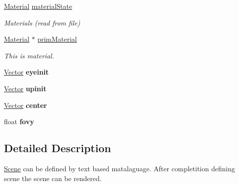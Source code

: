 \textbf{ }\par
\begin{DoxyCompactItemize}
\item 
\mbox{\hyperlink{class_material}{Material}} \mbox{\hyperlink{class_scene_a0a38f5f1255de8f6f5826e7dacb8cbd7}{material\+State}}
\begin{DoxyCompactList}\small\item\em Materials (read from file) \end{DoxyCompactList}\item 
\mbox{\label{class_scene_ab86c6bccfbab77ca61fd40459b973cd5}} 
\mbox{\hyperlink{class_material}{Material}} $\ast$ \mbox{\hyperlink{class_scene_ab86c6bccfbab77ca61fd40459b973cd5}{prim\+Material}}
\begin{DoxyCompactList}\small\item\em This is material. \end{DoxyCompactList}\end{DoxyCompactItemize}

\textbf{ }\par
\begin{DoxyCompactItemize}
\item 
\mbox{\label{class_scene_af9f98b854a542727409a27fd51982fc0}} 
\mbox{\hyperlink{struct_vector}{Vector}} {\bfseries eyeinit}
\item 
\mbox{\label{class_scene_acc674e1ead5cd3178883db9253cd1b5d}} 
\mbox{\hyperlink{struct_vector}{Vector}} {\bfseries upinit}
\item 
\mbox{\label{class_scene_ad9b3cf8cdb69fb9e6eac7462f3e3ec5b}} 
\mbox{\hyperlink{struct_vector}{Vector}} {\bfseries center}
\item 
\mbox{\label{class_scene_a27ca6faa0756d653d84661e0b29096fe}} 
float {\bfseries fovy}
\end{DoxyCompactItemize}



\subsection{Detailed Description}
\mbox{\hyperlink{class_scene}{Scene}} can be defined by text based matalaguage. After completition defining scene the scene can be rendered.

